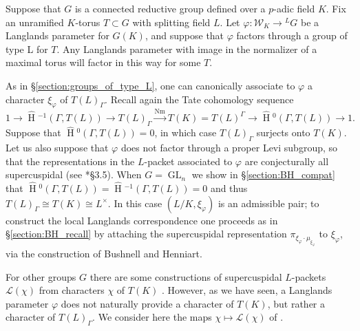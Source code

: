 \documentclass{compositio}
\theoremstyle{plain}
\newcommand{\HT}[1]{\hat{\HH}{}^{#1}}
\theoremstyle{definition}
\numberwithin{equation}{section}
\DeclareMathOperator{\HH}{H}
\DeclareMathOperator{\Nm}{Nm}
\DeclareMathOperator{\GL}{GL}
\newcommand{\Lx}{L^\times}
\newcommand{\Weil}{\mathcal{W}}
\newcommand{\Lpack}{\mathcal{L}}
\begin{document}
Suppose that $G$ is a connected reductive group defined over a
$p$-adic field $K$.  Fix an unramified $K$-torus $T \subset G$ with splitting field $L$.
Let $\varphi : \Weil_K \rightarrow {}^L G$ be a
Langlands parameter for $G(K)$, and suppose that $\varphi$ factors
through a group of type L for $T$.  Any Langlands parameter with image in the normalizer
of a maximal torus will factor in this way for some $T$.

As in \S\ref{section:groups_of_type_L}, one can canonically
associate to $\varphi$ a character $\xi_{\varphi}$ of $T(L)_{\Gamma}$.
Recall again the Tate cohomology sequence
$$1 \rightarrow \HT{-1}(\Gamma,T(L)) \rightarrow T(L)_{\Gamma} \xrightarrow{\Nm} T(K)
= T(L)^{\Gamma} \rightarrow \HT{0}(\Gamma,T(L)) \rightarrow 1.$$
Suppose that $\HT{0}(\Gamma, T(L)) = 0$, in which case
$T(L)_{\Gamma}$ surjects onto $T(K)$.  Let us also suppose that
$\varphi$ does not factor through a proper Levi subgroup, so that the
representations in the $L$-packet associated to $\varphi$ are
conjecturally all supercuspidal (see \cite{reeder-debacker:09a}*{\S 3.5}).
When $G = \GL_n$ we show in \S\ref{section:BH_compat} that
$\HT{0}(\Gamma, T(L)) = \HT{-1}(\Gamma, T(L)) = 0$ and thus
$T(L)_{\Gamma} \cong T(K) \cong \Lx$.  In this case
$(L/K, \xi_{\varphi})$ is an admissible pair; to construct the local Langlands
correspondence one proceeds as in \S\ref{section:BH_recall} by
attaching the supercuspidal representation $\pi_{\xi_{\varphi} \cdot
  \mu_{\xi_{\varphi}}}$ to $\xi_{\varphi}$, via the construction of Bushnell and Henniart.

For other groups $G$ there are some constructions of supercuspidal $L$-packets $\Lpack(\chi)$
from characters $\chi$ of $T(K)$ \cites{reeder-debacker:09a, kaletha:13a, reeder:08a}.
However, as we have seen, a Langlands parameter $\varphi$ does not naturally
provide a character of $T(K)$, but rather a character of
$T(L)_{\Gamma}$.  We consider here the maps $\chi \mapsto \Lpack(\chi)$ of \cites{reeder-debacker:09a, reeder:08a}.
\end{document}
